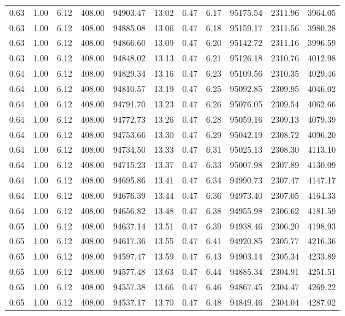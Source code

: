 \begin{table}[!ht]
\begin{tabular}{rrrrrrrrrrr}
0.63 & 1.00 & 6.12 & 408.00 & 94903.47 & 13.02 & 0.47 & 6.17 & 95175.54 & 2311.96 & 3964.05 \\
0.63 & 1.00 & 6.12 & 408.00 & 94885.08 & 13.06 & 0.47 & 6.18 & 95159.17 & 2311.56 & 3980.28 \\
0.63 & 1.00 & 6.12 & 408.00 & 94866.60 & 13.09 & 0.47 & 6.20 & 95142.72 & 2311.16 & 3996.59 \\
0.63 & 1.00 & 6.12 & 408.00 & 94848.02 & 13.13 & 0.47 & 6.21 & 95126.18 & 2310.76 & 4012.98 \\
0.64 & 1.00 & 6.12 & 408.00 & 94829.34 & 13.16 & 0.47 & 6.23 & 95109.56 & 2310.35 & 4029.46 \\
0.64 & 1.00 & 6.12 & 408.00 & 94810.57 & 13.19 & 0.47 & 6.25 & 95092.85 & 2309.95 & 4046.02 \\
0.64 & 1.00 & 6.12 & 408.00 & 94791.70 & 13.23 & 0.47 & 6.26 & 95076.05 & 2309.54 & 4062.66 \\
0.64 & 1.00 & 6.12 & 408.00 & 94772.73 & 13.26 & 0.47 & 6.28 & 95059.16 & 2309.13 & 4079.39 \\
0.64 & 1.00 & 6.12 & 408.00 & 94753.66 & 13.30 & 0.47 & 6.29 & 95042.19 & 2308.72 & 4096.20 \\
0.64 & 1.00 & 6.12 & 408.00 & 94734.50 & 13.33 & 0.47 & 6.31 & 95025.13 & 2308.30 & 4113.10 \\
0.64 & 1.00 & 6.12 & 408.00 & 94715.23 & 13.37 & 0.47 & 6.33 & 95007.98 & 2307.89 & 4130.09 \\
0.64 & 1.00 & 6.12 & 408.00 & 94695.86 & 13.41 & 0.47 & 6.34 & 94990.73 & 2307.47 & 4147.17 \\
0.64 & 1.00 & 6.12 & 408.00 & 94676.39 & 13.44 & 0.47 & 6.36 & 94973.40 & 2307.05 & 4164.33 \\
0.64 & 1.00 & 6.12 & 408.00 & 94656.82 & 13.48 & 0.47 & 6.38 & 94955.98 & 2306.62 & 4181.59 \\
0.65 & 1.00 & 6.12 & 408.00 & 94637.14 & 13.51 & 0.47 & 6.39 & 94938.46 & 2306.20 & 4198.93 \\
0.65 & 1.00 & 6.12 & 408.00 & 94617.36 & 13.55 & 0.47 & 6.41 & 94920.85 & 2305.77 & 4216.36 \\
0.65 & 1.00 & 6.12 & 408.00 & 94597.47 & 13.59 & 0.47 & 6.43 & 94903.14 & 2305.34 & 4233.89 \\
0.65 & 1.00 & 6.12 & 408.00 & 94577.48 & 13.63 & 0.47 & 6.44 & 94885.34 & 2304.91 & 4251.51 \\
0.65 & 1.00 & 6.12 & 408.00 & 94557.38 & 13.66 & 0.47 & 6.46 & 94867.45 & 2304.47 & 4269.22 \\
0.65 & 1.00 & 6.12 & 408.00 & 94537.17 & 13.70 & 0.47 & 6.48 & 94849.46 & 2304.04 & 4287.02 \\

\end{tabular}
\end{table}
